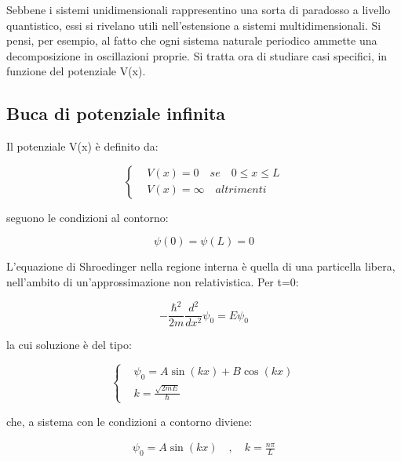 \documentclass{article}
\begin{document}
Sebbene i sistemi unidimensionali rappresentino una sorta di paradosso a livello quantistico, essi si rivelano utili nell'estensione a sistemi multidimensionali.
Si pensi, per esempio, al fatto che ogni sistema naturale periodico ammette una decomposizione in oscillazioni proprie.
Si tratta ora di studiare casi specifici, in funzione del potenziale V(x).

\subsection{Buca di potenziale infinita}

Il potenziale V(x) è definito da:

\begin{equation}
    \left\{
    \begin{aligned}
         & V(x)=0 \quad se \quad 0\leq x\leq L \\
         & V(x)=\infty \quad altrimenti
    \end{aligned}
    \right.
\end{equation}

seguono le condizioni al contorno:

\begin{equation}
    \psi(0)=\psi(L)=0
\end{equation}

L'equazione di Shroedinger nella regione interna è quella di una particella libera, nell'ambito di un'approssimazione
non relativistica. Per t=0:

\begin{equation}
    -\frac{\hbar^2}{2m}\frac{d^2}{dx^2}\psi_0= E\psi_0
\end{equation}

la cui soluzione è del tipo:

\begin{equation}
    \left\{
    \begin{aligned}
         & \psi_0=A\sin(kx)+B\cos(kx) \\
         & k=\frac{\sqrt{2mE}}{\hbar}
    \end{aligned}
    \right.
\end{equation}

che, a sistema con le condizioni a contorno diviene:

\begin{equation}
    \begin{aligned}
        \psi_0= A\sin(kx) \quad , \quad k=\frac{n\pi}{L}
    \end{aligned}
\end{equation}
\end{document}
